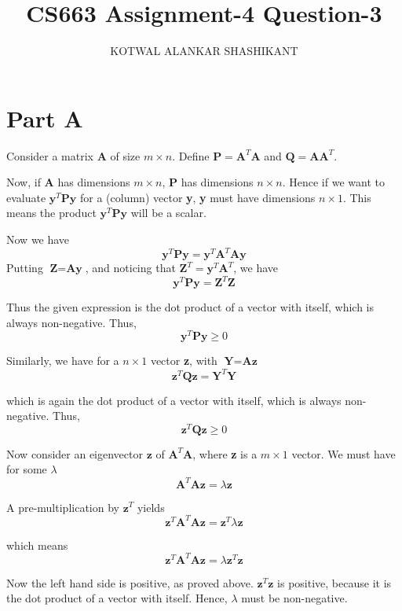 \documentclass[10pt]{report}
\begin{document}
\title{CS663 Assignment-4 Question-3}
\author{KOTWAL ALANKAR SHASHIKANT}
\maketitle

\section*{Part A}
Consider a matrix \textbf{A} of size $m \times n$. 	Define $\textbf{P}=\textbf{A}^T \textbf{A}$ and $\textbf{Q}=\textbf{A} \textbf{A}^T$.

Now, if \textbf{A} has dimensions $m \times n$, \textbf{P} has dimensions $n \times n$. Hence if we want to evaluate $\textbf{y}^T \textbf{P} \textbf{y}$ for a (column) vector \textbf{y}, \textbf{y} must have dimensions $n \times 1$. This means the product $\textbf{y}^T \textbf{P} \textbf{y}$ will be a scalar.

Now we have $$\textbf{y}^T \textbf{P} \textbf{y} = \textbf{y}^T \textbf{A}^T \textbf{A} \textbf{y}$$
Putting $\textbf{Z} = \textbf{A}\textbf{y}$, and noticing that $\textbf{Z}^T = \textbf{y}^T \textbf{A}^T$, we have $$\textbf{y}^T \textbf{P} \textbf{y} = \textbf{Z}^T \textbf{Z}$$

Thus the given expression is the dot product of a vector with itself, which is always non-negative. Thus, $$\textbf{y}^T \textbf{P} \textbf{y} \geq 0$$

Similarly, we have for a $n \times 1$ vector \textbf{z}, with $\textbf{Y} = \textbf{A}\textbf{z}$ $$\textbf{z}^T \textbf{Q} \textbf{z} = \textbf{Y}^T \textbf{Y}$$

which is again the dot product of a vector with itself, which is always non-negative. Thus, $$\textbf{z}^T \textbf{Q} \textbf{z} \geq 0$$

Now consider an eigenvector $\textbf{z}$ of $\textbf{A}^T \textbf{A}$, where \textbf{z} is a $m \times 1$ vector. We must have for some $\lambda$
$$\textbf{A}^T \textbf{A} \textbf{z} = \lambda \textbf{z}$$

A pre-multiplication by $\textbf{z}^T$ yields
$$\textbf{z}^T \textbf{A}^T \textbf{A} \textbf{z} = \textbf{z}^T \lambda \textbf{z}$$

which means
$$\textbf{z}^T \textbf{A}^T \textbf{A} \textbf{z} = \lambda \textbf{z}^T \textbf{z}$$

Now the left hand side is positive, as proved above. $\textbf{z}^T \textbf{z}$ is positive, because it is the dot product of a vector with itself. Hence, $\lambda$ must be non-negative.
\end{document}
